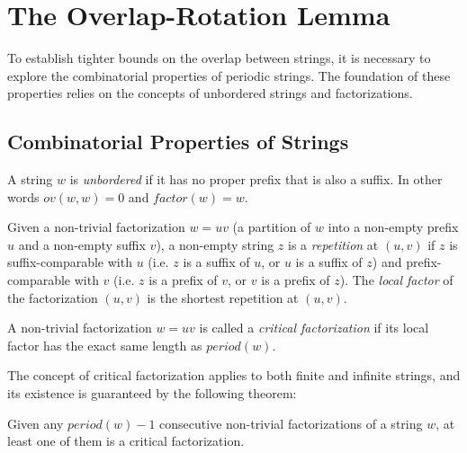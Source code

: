 \section{The Overlap-Rotation Lemma}

To establish tighter bounds on the overlap between strings, it is necessary to
explore the combinatorial properties of periodic strings. The foundation of
these properties relies on the concepts of unbordered strings and
factorizations.

\subsection{Combinatorial Properties of Strings}

\begin{definition}
A string $w$ is \textit{unbordered} if it has no proper prefix that is also a
suffix. In other words $ov(w, w) = 0$ and $\textit{factor}(w) = w$.
\end{definition}

\begin{definition}
Given a non-trivial factorization $w = uv$ (a partition of $w$ into a non-empty
prefix $u$ and a non-empty suffix $v$), a non-empty string $z$ is a
\textit{repetition} at $(u,v)$ if $z$ is suffix-comparable with $u$ (i.e. $z$ is
a suffix of $u$, or $u$ is a suffix of $z$) and prefix-comparable with $v$ (i.e.
$z$ is a prefix of $v$, or $v$ is a prefix of $z$). The \textit{local factor} of
the factorization $(u,v)$ is the shortest repetition at $(u,v)$.

A non-trivial factorization $w = uv$ is called a \textit{critical factorization}
if its local factor has the exact same length as $\textit{period}(w)$.
\end{definition}

The concept of critical factorization applies to both finite and infinite
strings, and its existence is guaranteed by the following theorem:

\begin{theorem}\label{th:critical_factorization}
Given any $\textit{period}(w) - 1$ consecutive non-trivial factorizations of a
string $w$, at least one of them is a critical factorization.
\end{theorem}

